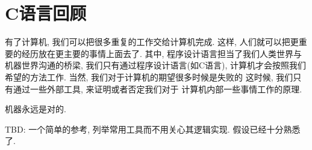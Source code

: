 \part{C语言回顾}

有了计算机, 我们可以把很多重复的工作交给计算机完成.
这样, 人们就可以把更重要的经历放在更主要的事情上面去了. 
其中, 程序设计语言担当了我们人类世界与机器世界沟通的桥梁, 
我们只有通过程序设计语言(如C语言), 计算机才会按照我们
希望的方法工作. 当然, 我们对于计算机的期望很多时候是失败的
这时候, 我们只有通过一些外部工具, 来证明或者否定我们对于
计算机内部一些事情工作的原理. 

\begin{axiom}
    机器永远是对的. 
\end{axiom}

TBD: 一个简单的参考, 列举常用工具而不用关心其逻辑实现. 假设已经十分熟悉
了. 

